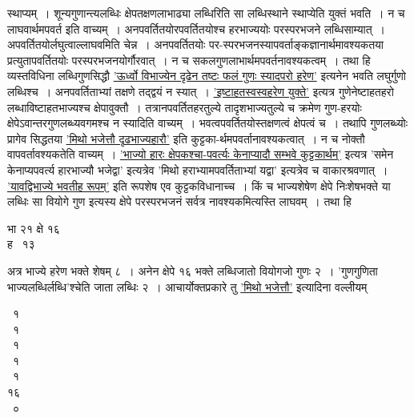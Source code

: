 \documentclass[11pt, openany]{book}
\begin{document}
\newpage

\begin{sloppypar}
\noindent स्थाप्यम्~। शून्यगुणान्त्यलब्धिः क्षेपतक्षणलाभाढ्या लब्धिरिति सा लब्धिस्थाने स्थाप्येति युक्तं भवति~। न च लाघवार्थमपवर्त इति वाच्यम्~। अनपवर्तितयोरपवर्तितयोश्च हरभाज्ययोः परस्परभजने लब्धिसाम्यात्~। अपवर्तितयोर्लघुत्वाल्लाघवमिति चेन्न~। अनपवर्तितयोः पर-स्परभजनस्यापवर्ताङ्कज्ञानार्थमावश्यकतया प्रत्युतापवर्तितयोः परस्परभजनयोर्गौरवात्~। न च सकलगुणलाभार्थमपवर्तनावश्यकत्वम्~। तथा हि\textendash \,व्यस्तविधिना लब्धिगुणसिद्धौ \hyperref[5.51]{'ऊर्ध्वो विभाज्येन दृढेन तष्टः फलं गुणः स्यादपरो हरेण'} इत्यनेन भवति लघुर्गुणो लब्धिश्च~। अनपवर्तिताभ्यां तक्षणे तद्द्वयं न स्यात्~। \hyperref[5.59]{'इष्टाहतस्वस्वहरेण युक्ते'} इत्यत्र गुणेनेष्टाहतहरो लब्धाविष्टाहतभाज्यश्च क्षेपावुक्तौ~। तत्रानपवर्तितहरतुल्ये तादृशभाज्यतुल्ये च क्रमेण गुण-हरयोः क्षेपेऽवान्तरगुणलब्ध्यवगमश्च न स्यादिति वाच्यम्~। भवत्वपवर्तितयोस्तक्षणत्वं क्षेपत्वं च~। तथापि गुणलब्ध्योः प्रागेव सिद्धतया \hyperref[5.51]{'मिथो भजेत्तौ दृढभाज्यहारौ'} इति कुट्टका-र्थमपवर्तानावश्यकत्वात्~। न च नोक्तौ वापवर्तावश्यकतेति वाच्यम्~। \hyperref[5.50]{'भाज्यो हारः क्षेपकश्चा-पवर्त्यः केनाप्यादौ सम्भवे कुट्टकार्थम्'} इत्यत्र {\color{violet}'समेन केनाप्यपवर्त्य हारभाज्यौ भजेद्वा'} इत्यत्रेव {\color{violet}'मिथो हराभ्यामपवर्तिताभ्यां यद्वा'} इत्यत्रेव च वाकारश्रवणात्~। \hyperref[5.51]{'यावद्विभाज्ये भवतीह रूपम्'} इति रूपशेष एव कुट्टकविधानाच्च~। किं च भाज्यशेषेण क्षेपे निःशेषभक्ते या लब्धिः सा वियोगे गुण इत्यस्य क्षेपे परस्परभजनं सर्वत्र नावश्यकमित्यस्ति लाघवम्~। तथा हि\textendash
\vspace{-3mm}

\begin{center}
भा २१ क्षे १६ \\
ह ~१३ ~~~~~~~
\end{center}
\vspace{-1mm}

\noindent अत्र भाज्ये हरेण भक्ते शेषम् ८~। अनेन क्षेपे १६ भक्ते लब्धिजातो वियोगजो गुणः २~। {\color{violet}'गुणगुणिता भाज्यलब्धिर्लब्धि'}श्चेति जाता लब्धिः २~। आचार्योक्तप्रकारे तु \hyperref[5.51]{'मिथो भजेत्तौ'} इत्यादिना वल्लीयम् 
\vspace{-3mm}

\begin{center}
~१\\
~१\\
~१\\
~१\\
~१\\
१६\\
~०
\end{center}
\end{sloppypar}
\end{document}
